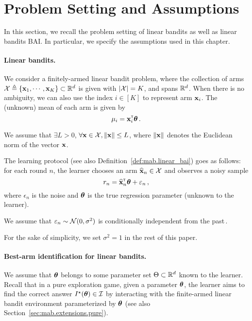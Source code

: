\section{Problem Setting and Assumptions}\label{sec:lgc.formulation}

In this section, we recall the problem setting of linear bandits as well as linear bandits BAI. In particular, we specify the assumptions used in this chapter.

\paragraph{Linear bandits.}
We consider a finitely-armed linear bandit problem, where the collection of arms $\mathcal{X}\triangleq\{{\bf x}_1,\cdots,{\bf x}_K\}\subset \mathbb{R}^d$ is given with $|\mathcal{X}|=K$, and spans $\mathbb{R}^d$. When there is no ambiguity, we can also use the index $i\in[K]$ to represent arm ${\bf x}_i$. The (unknown) mean of each arm is given by
\[
    \mu_i = {\bf x}_i^\mathsf{\scriptscriptstyle T}{\boldsymbol \theta}\,.
\]

\begin{assumption}\label{ass:lgc.bounded_arm}
\begin{leftbar}[assumptionbar]
    We assume that $\exists L>0$, $\forall {\bf x}\in\mathcal{X}, \left\lVert{\bf x}\right\rVert\leq L$, where $\left\lVert{\bf x}\right\rVert$ denotes the Euclidean norm of the vector ${\bf x}$.
\end{leftbar}
\end{assumption}

The learning protocol (see also Definition~\ref{def:mab.linear_bai}) goes as follows: for each round $n$, the learner chooses an arm $\widehat{{\bf x}}_n\in\mathcal{X}$ and observes a noisy sample
\[
    r_n = \widehat{{\bf x}}_n^\mathsf{\scriptscriptstyle T}{\boldsymbol \theta} +\varepsilon_n\,,
\]
where $\epsilon_n$ is the noise and ${\boldsymbol \theta}$ is the true regression parameter (unknown to the learner).
\begin{assumption}\label{ass:lgc.noise}
\begin{leftbar}[assumptionbar]
    We assume that $\varepsilon_n \sim \mathcal{N}(0,\sigma^2)$ is conditionally independent from the past\,.
\end{leftbar}
\end{assumption}
For the sake of simplicity, we set $\sigma^2 = 1$ in the rest of this paper.

\paragraph{Best-arm identification for linear bandits.}
We assume that ${\boldsymbol \theta}$ belongs to some parameter set $\Theta\subset\mathbb{R}^d$ known to the learner. Recall that in a pure exploration game, given a parameter ${\boldsymbol \theta}$, the learner aims to find the correct answer $I^\star({\boldsymbol \theta})\in\mathcal{I}$ by interacting with the finite-armed linear bandit environment parameterized by ${\boldsymbol \theta}$ (see also Section~\ref{sec:mab.extensions.pure}).

